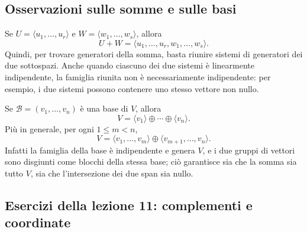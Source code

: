 \documentclass[11pt,a4paper]{article}
\theoremstyle{plain}
\theoremstyle{definition}
\theoremstyle{remark}
\begin{document}
\subsection{Osservazioni sulle somme e sulle basi}

Se $U=\langle u_1,\ldots,u_r\rangle$ e $W=\langle w_1,\ldots,w_s\rangle$, allora
\[
 U+W=\langle u_1,\ldots,u_r,w_1,\ldots,w_s\rangle.
\]
Quindi, per trovare generatori della somma, basta riunire sistemi di generatori dei due sottospazi. Anche quando ciascuno dei due sistemi è linearmente indipendente, la famiglia riunita non è necessariamente indipendente: per esempio, i due sistemi possono contenere uno stesso vettore non nullo.

Se $\mathcal B=(v_1,\ldots,v_n)$ è una base di $V$, allora
\[
 V=\langle v_1\rangle\oplus\cdots\oplus\langle v_n\rangle.
\]
Più in generale, per ogni $1\leq m<n$,
\[
 V=\langle v_1,\ldots,v_m\rangle\oplus
   \langle v_{m+1},\ldots,v_n\rangle.
\]
Infatti la famiglia della base è indipendente e genera $V$, e i due gruppi di vettori sono disgiunti come blocchi della stessa base; ciò garantisce sia che la somma sia tutto $V$, sia che l'intersezione dei due span sia nullo.

\subsection{Esercizi della lezione 11: complementi e coordinate}
\end{document}
